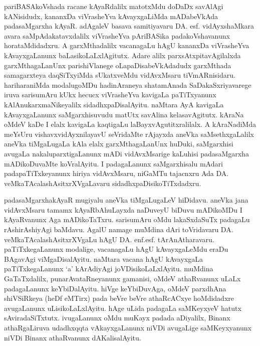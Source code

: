 pariBASAkoVshada racane kAyaRdalilx matotxMdu doDaDx savAlAgi kANisidudx, kananxDa viVrasheYva kAvayxgaLiMda mADabeVkAda padasaMgarxha kAyaR. adAgaleV basava samitiyavaru DA. esf. vidAyxshaMkara avara saMpAdakatavxdalilx viVrasheYva pAri\-BASika padakoVshavanunx horataMdidadxru. A garxMthadalilx vacanagaLu hAgU kananxDa viVrasheYva kAvayxgaLanunx baLasikoLaLxlAgitutx. Adare alilx parxsAtxpita\-vAgilalxda  garxMthagaLanUnx parishiVlanege oLapaDisabeVkAdadudx garxMthada samagarxteya daqSiTxyiMda sUkatxveMdu vidAvxMsaru tiVmARni\-sidaru. hariharaniMda modalugoMDu hadinAraneya shatamAnada SaDakaSxriyavarege iruva sarisumAru kUkx hecucx viVrasheYva kavigaLa paTiTxyanunx kAlAnukarxmaNikeyalilx sidadhxpaDisalAyitu. naMtara AyA kavigaLa kAvayxgaLanunx saMgarxhisuvudu matUtx savAlina kelasavAgitutx. kAraNa oMdeV kaDe I elalx kavigaLa kaqtigaLu laBayxvAgutitxralilalx. A kAraNadiMda meYsUru vishavxvidAyx\-nilayavU seVridaMte rAjayxda aneVka saMsethxgaLalilx aneVka tiMgaLugaLa kAla elalx garxMthagaLanUnx huDuki, saMgarxhisi avugaLa nakalu\-parxtigaLanunx mADi vidAvxMsarige kaLuhisi padasaMgarxha mADikoDuvaMte koVralAyitu. I padagaLanunx saMgarxhisalu mAdari padapaTiTxkeyanunx hiriya vidAvxMsaru, niGaMTu tajacnxru Ada DA. veMkaTAcalashAsitxrXVgaLavaru sidadhxpaDisikoTiTxdadxru.

padasaMgarxhakAyaR mugiyalu aneVka tiMgaLugaLeV hiDidavu. aneVka jana vidAvxMsaru tamamx kAyaRbAhuLayxda naDuveyU biDuvu mADikoMDu I kAyaRvanunx Aga mADikoTaTxru. sarisumAru oMdu lakaSxdaSuTx padagaLu rAshirAshiyAgi baMdavu. AgalU namage muMdina dAri toVridavaru      DA. veMkaTAcalashAsitxrXVgaLu hAgU DA. enf.esf. tArAnAtharavaru. paTiTxkegaLanunx modalige, vacanagaLu hAgU kAvayxgaLeMdu eraDu BAgavAgi viMgaDisalAyitu. naMtara vacana hAgU kAvayxgaLa paTiTxkegaLanunx `a' kArAdiyAgi joVDisikoLaLxlAyitu. muMdina GaTaTxdalilx, punarAvataRneyanunx gamanisi, oMdeV athaRvanunx uLaLx padagaLanunx keYbiDalAyitu. hiVge keYbiDuvAga, oMdeV parxdhAna shiVSiRkeya (heDf eMTirx) pada beVre beVre athaRcACxye hoMdidadxre avugaLanunx uLisikoLaLxlAyitu. hAge uLida padagaLa saMKeyxyeV hatutx sAviradaSiTxtutx. ivugaLanunx oMdu muKayx padada aDiyalilx, Binanx athaRgaLiruva udadhxqqta vAkayxgaLanunx niVDi avugaLige saMKeyxyanunx niVDi Binanx athaRvanunx dAKalisalAyitu.

